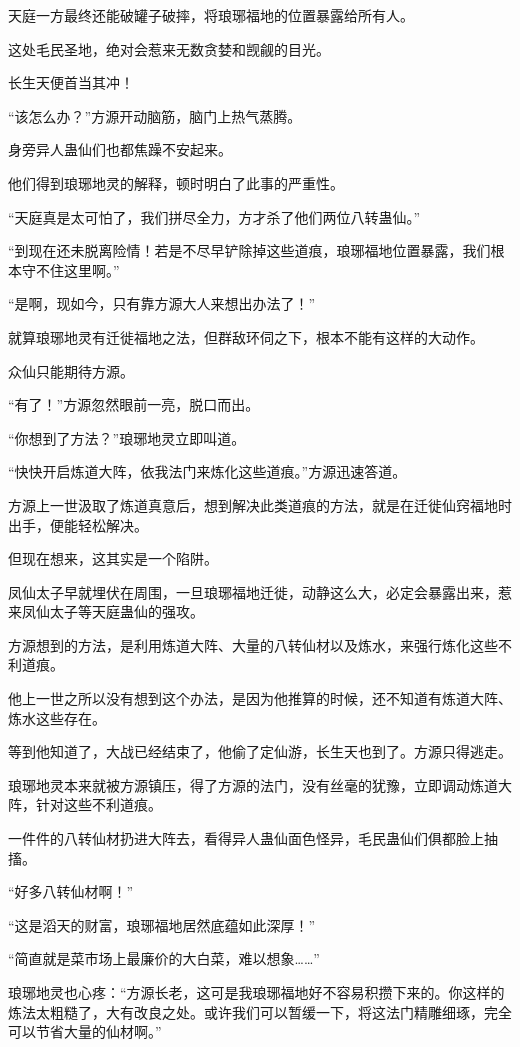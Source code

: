 \begin{this_body}
天庭一方最终还能破罐子破摔，将琅琊福地的位置暴露给所有人。

这处毛民圣地，绝对会惹来无数贪婪和觊觎的目光。

长生天便首当其冲！

“该怎么办？”方源开动脑筋，脑门上热气蒸腾。

身旁异人蛊仙们也都焦躁不安起来。

他们得到琅琊地灵的解释，顿时明白了此事的严重性。

“天庭真是太可怕了，我们拼尽全力，方才杀了他们两位八转蛊仙。”

“到现在还未脱离险情！若是不尽早铲除掉这些道痕，琅琊福地位置暴露，我们根本守不住这里啊。”

“是啊，现如今，只有靠方源大人来想出办法了！”

就算琅琊地灵有迁徙福地之法，但群敌环伺之下，根本不能有这样的大动作。

众仙只能期待方源。

“有了！”方源忽然眼前一亮，脱口而出。

“你想到了方法？”琅琊地灵立即叫道。

“快快开启炼道大阵，依我法门来炼化这些道痕。”方源迅速答道。

方源上一世汲取了炼道真意后，想到解决此类道痕的方法，就是在迁徙仙窍福地时出手，便能轻松解决。

但现在想来，这其实是一个陷阱。

凤仙太子早就埋伏在周围，一旦琅琊福地迁徙，动静这么大，必定会暴露出来，惹来凤仙太子等天庭蛊仙的强攻。

方源想到的方法，是利用炼道大阵、大量的八转仙材以及炼水，来强行炼化这些不利道痕。

他上一世之所以没有想到这个办法，是因为他推算的时候，还不知道有炼道大阵、炼水这些存在。

等到他知道了，大战已经结束了，他偷了定仙游，长生天也到了。方源只得逃走。

琅琊地灵本来就被方源镇压，得了方源的法门，没有丝毫的犹豫，立即调动炼道大阵，针对这些不利道痕。

一件件的八转仙材扔进大阵去，看得异人蛊仙面色怪异，毛民蛊仙们俱都脸上抽搐。

“好多八转仙材啊！”

“这是滔天的财富，琅琊福地居然底蕴如此深厚！”

“简直就是菜市场上最廉价的大白菜，难以想象……”

琅琊地灵也心疼：“方源长老，这可是我琅琊福地好不容易积攒下来的。你这样的炼法太粗糙了，大有改良之处。或许我们可以暂缓一下，将这法门精雕细琢，完全可以节省大量的仙材啊。”


\end{this_body}
